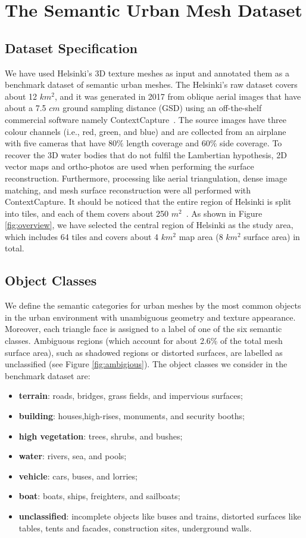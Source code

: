 \section{The Semantic Urban Mesh Dataset}\label{sec:framework}
\subsection{Dataset Specification}

We have used Helsinki's 3D texture meshes as input and annotated them as a benchmark dataset of semantic urban meshes. 
The Helsinki's raw dataset covers about 12 $ km^2 $, and it was generated in 2017 from oblique aerial images that have about a 7.5 $cm$  ground sampling distance (GSD) using an off-the-shelf commercial software namely ContextCapture~\citep{contextcap}.
The source images have three colour channels (i.e., red, green, and blue) and are collected from an airplane with five cameras that have $80\%$ length coverage and $60\%$ side coverage.
To recover the 3D water bodies that do not fulfil the Lambertian hypothesis, 2D vector maps and ortho-photos are used when performing the surface reconstruction.
Furthermore, processing like aerial triangulation, dense image matching, and mesh surface reconstruction were all performed with ContextCapture.
It should be noticed that the entire region of Helsinki is split into tiles, and each of them covers about 250 $ m^2 $~\citep{kalasatamaReport}.
As shown in Figure \ref{fig:overview},  we have selected the central region of Helsinki as the study area, which includes 64 tiles and covers about 4 $km^2$ map area (8 $km^2$ surface area) in total.   

\subsection{Object Classes}
We define the semantic categories for urban meshes by the most common objects in the urban environment with unambiguous geometry and texture appearance.
Moreover, each triangle face is assigned to a label of one of the six semantic classes. 
Ambiguous regions (which account for about 2.6\% of the total mesh surface area), such as shadowed regions or distorted surfaces, are labelled as unclassified (see Figure \ref{fig:ambigious}).
The object classes we consider in the benchmark dataset are: 
\begin{itemize}
	\item \textbf{terrain}: roads, bridges, grass fields, and impervious surfaces;
	\item \textbf{building}: houses,high-rises, monuments, and security booths;
	\item \textbf{high vegetation}: trees, shrubs, and bushes;
	\item \textbf{water}: rivers, sea, and pools;
	\item \textbf{vehicle}: cars, buses, and lorries;  
	\item \textbf{boat}: boats, ships, freighters, and sailboats;
	\item \textbf{unclassified}: incomplete objects like buses and trains, distorted surfaces like tables, tents and facades, construction sites, underground walls.
\end{itemize}

